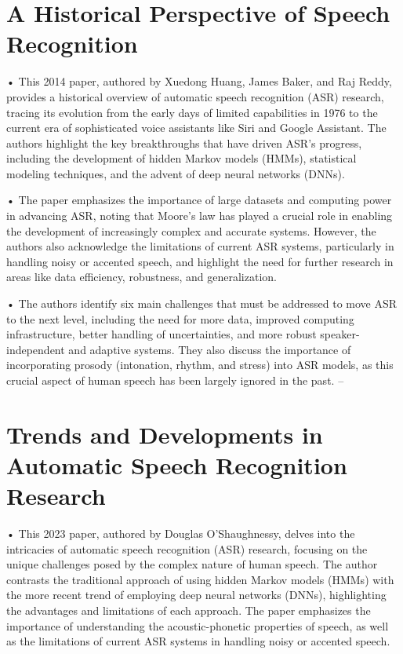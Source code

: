 \section{A Historical Perspective of Speech Recognition}

• This 2014 paper, authored by Xuedong Huang, James Baker, and Raj Reddy, provides a historical overview of automatic speech recognition (ASR) research, tracing its evolution from the early days of limited capabilities in 1976 to the current era of sophisticated voice assistants like Siri and Google Assistant. The authors highlight the key breakthroughs that have driven ASR's progress, including the development of hidden Markov models (HMMs), statistical modeling techniques, and the advent of deep neural networks (DNNs).

• The paper emphasizes the importance of large datasets and computing power in advancing ASR, noting that Moore's law has played a crucial role in enabling the development of increasingly complex and accurate systems. However, the authors also acknowledge the limitations of current ASR systems, particularly in handling noisy or accented speech, and highlight the need for further research in areas like data efficiency, robustness, and generalization.

• The authors identify six main challenges that must be addressed to move ASR to the next level, including the need for more data, improved computing infrastructure, better handling of uncertainties, and more robust speaker-independent and adaptive systems. They also discuss the importance of incorporating prosody (intonation, rhythm, and stress) into ASR models, as this crucial aspect of human speech has been largely ignored in the past.
--

\section{Trends and Developments in Automatic Speech Recognition Research}

•	This 2023 paper, authored by Douglas O'Shaughnessy, delves into the intricacies of automatic speech recognition (ASR) research, focusing on the unique challenges posed by the complex nature of human speech. The author contrasts the traditional approach of using hidden Markov models (HMMs) with the more recent trend of employing deep neural networks (DNNs), highlighting the advantages and limitations of each approach. The paper emphasizes the importance of understanding the acoustic-phonetic properties of speech, as well as the limitations of current ASR systems in handling noisy or accented speech.

